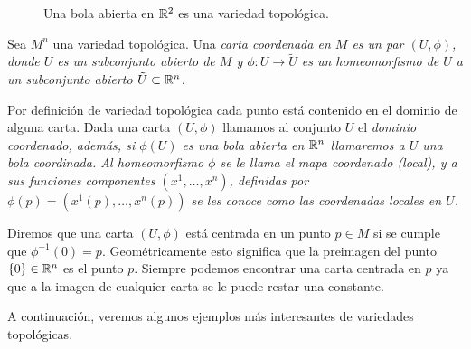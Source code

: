 \begin{figure}[h]
	\centering
	
	\caption{Una bola abierta en $\mathbb{R}^{2}$ es una variedad topológica.}
\end{figure}


\begin{definition}\label{Definición: Cartas Coordenadas}
	Sea $M^n$ una variedad topológica. Una \it{carta coordenada} en $M$ es un par $(U, \phi)$, donde $U$ es un subconjunto abierto de $M$ y $\phi: U \to \tilde{U}$ es un homeomorfismo de $U$ a un subconjunto abierto $\tilde{U} \subset \mathbb{R}^n$.
\end{definition}

Por definición de variedad topológica cada punto está contenido en el dominio de alguna carta. Dada una carta $(U,\phi)$ llamamos al conjunto $U$ el \it{dominio coordenado}, además, si $\phi(U)$ es una bola abierta en $\mathbb{R}^n$ llamaremos a $U$ una \it{bola coordinada}. Al homeomorfismo $\phi$ se le llama el \it{mapa coordenado (local)}, y a sus funciones componentes $(x^1,\hdots,x^n)$, definidas por $\phi(p) = (x^1(p), \hdots, x^n(p))$ se les conoce como las \it{coordenadas locales} en $U$.

Diremos que una carta $(U,\phi)$ está centrada en un punto $p \in M$ si se cumple que $\phi^{-1}(0) = p$. Geométricamente esto significa que la preimagen del punto $\{0\} \in \mathbb{R}^{n}$ es el punto $p$. Siempre podemos encontrar una carta centrada en $p$ ya que a la imagen de cualquier carta se le puede restar una constante.

A continuación, veremos algunos ejemplos más interesantes de variedades topológicas.


